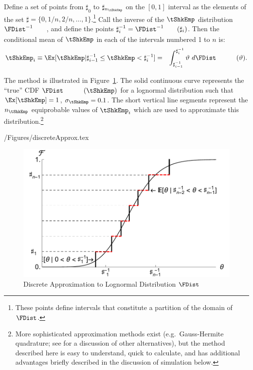 \documentclass[titlepage]{\econtex}
\begin{document}
 Define a set of points from $\sharp_{0}$ to $\sharp_{n_{\tShkEmp}}$ on the $[0,1]$ interval
as the elements of the set $\sharp = \{0,1/n,2/n, \ldots,1\}$.\footnote{These points define intervals that constitute a partition of the domain of $\FDist$.}  Call the inverse of the $\tShkEmp$ distribution $\FDist^{-1}_{\phantom{\tShkEmp}}$, and define the
points $\sharp^{-1}_{i} = \FDist^{-1}_{\phantom{\tShkEmp}}(\sharp_{i})$.  Then
the conditional mean of $\tShkEmp$ in each of the intervals numbered 1 to $n$ is:
\begin{eqnarray}
  \tShkEmp_{i} \equiv \Ex[\tShkEmp | \sharp_{i-1}^{-1} \leq \tShkEmp < \sharp_{i}^{-1}] & = & \int_{\sharp^{-1}_{i-1}}^{\sharp^{-1}_{i}} \vartheta ~ d\FDist_{\phantom{\tShkEmp}}(\vartheta)  .
\end{eqnarray}

The method is illustrated in Figure~\ref{fig:discreteapprox}.  The solid continuous curve represents
the ``true'' CDF $\FDist_{\phantom{\tShkEmp}}(\tShkEmp)$ for a lognormal distribution such that $\Ex[\tShkEmp] = 1$, $\sigma_{\tShkEmp} = 0.1$.  The short vertical line segments represent the $n_{\tShkEmp}$
equiprobable values of $\tShkEmp_{i}$ which are used to approximate this
distribution.\footnote{More sophisticated approximation methods exist
  (e.g.\ Gauss-Hermite quadrature; see \cite{kopecky2010finite} for a discussion of other alternatives), but the method described here is easy to understand, quick to calculate, and has additional advantages briefly described in the
  discussion of simulation below.}
\begin{verbatimwrite}{\econtexRoot/Figures/discreteApprox.tex}
  \hypertarget{discreteApprox}{}
  \begin{figure}
    \includegraphics{./Figures/discreteApprox}
    \caption{Discrete Approximation to Lognormal Distribution $\FDist$}
    \label{fig:discreteapprox}
  \end{figure}
\end{verbatimwrite}

\end{document}
